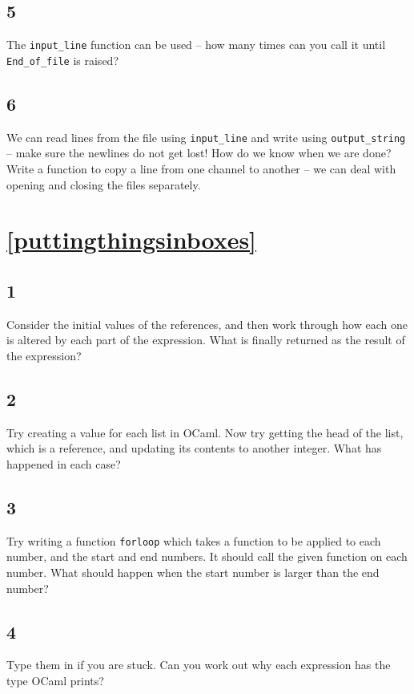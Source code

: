 \documentclass[]{book}
\begin{document}
\subsection*{5}
The \texttt{input\_line} function can be used -- how many times can you call it until \texttt{End\_of\_file} is raised?

\subsection*{6}
We can read lines from the file using \texttt{input\_line} and write using \texttt{output\_string} -- make sure the newlines do not get lost! How do we know when we are done? Write a function to copy a line from one channel to another -- we can deal with opening and closing the files separately.

\section*{\ref{puttingthingsinboxes}\\ }
\subsection*{1}
Consider the initial values of the references, and then work through how each one is altered by each part of the expression. What is finally returned as the result of the expression?

\subsection*{2}
Try creating a value for each list in OCaml. Now try getting the head of the list, which is a reference, and updating its contents to another integer. What has happened in each case?

\subsection*{3}
Try writing a function \texttt{forloop} which takes a function to be applied to each number, and the start and end numbers. It should call the given function on each number. What should happen when the start number is larger than the end number?

\subsection*{4}
Type them in if you are stuck. Can you work out why each expression has the type OCaml prints?
\end{document}
